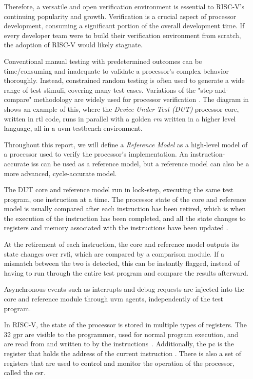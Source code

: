 Therefore, a versatile and open verification environment is essential to RISC-V's continuing popularity and growth. Verification is a crucial aspect of processor development, consuming a significant portion of the overall development time. If every developer team were to build their verification environment from scratch, the adoption of RISC-V would likely stagnate.

Conventional manual testing with predetermined outcomes can be time\-/consuming and inadequate to validate a processor's complex behavior thoroughly. Instead, constrained random testing is often used to generate a wide range of test stimuli, covering many test cases. Variations of the "step-and-compare" methodology are widely used for processor verification \cite{taylorAdvancedRISCVVerification2023}. The diagram in  shows an example of this, where the \textit{Device Under Test (DUT)} processor core, written in \acrfull{rtl} code, runs in parallel with a golden \textit{\gls{rm}} written in a higher level language, all in a \acrfull{uvm} testbench environment. 

Throughout this report, we will define a \textit{Reference Model} as a high-level model of a processor used to verify the processor's implementation. An instruction-accurate \acrfull{iss} can be used as a reference model, but a reference model can also be a more advanced, cycle-accurate model. 

The DUT core and reference model run in lock-step, executing the same test program, one instruction at a time. 
The processor state of the core and reference model is usually compared after each instruction has been \gls{retired}, which is when the execution of the instruction has been completed, and all the state changes to registers and memory associated with the instructions have been updated \cite{taylorAdvancedRISCVVerification2023}. 

At the retirement of each instruction, the core and reference model outputs its state changes over \acrfull{rvfi}, which are compared by a comparison module. If a mismatch between the two is detected, this can be instantly flagged, instead of having to run through the entire test program and compare the results afterward. 

Asynchronous events such as interrupts and debug requests are injected into the core and reference module through \acrshort{uvm} agents, independently of the test program.

In RISC-V, the state of the processor is stored in multiple types of registers. The 32 \acrfull{gpr} are visible to the programmer, used for normal program execution, and are read from and written to by the instructions~\cite{watermanRISCVInstructionSet2019}. Additionally, the \acrfull{pc} is the register that holds the address of the current instruction \cite{watermanRISCVInstructionSet2019}. There is also a set of registers that are used to control and monitor the operation of the processor, called the \acrfull{csr}. 

